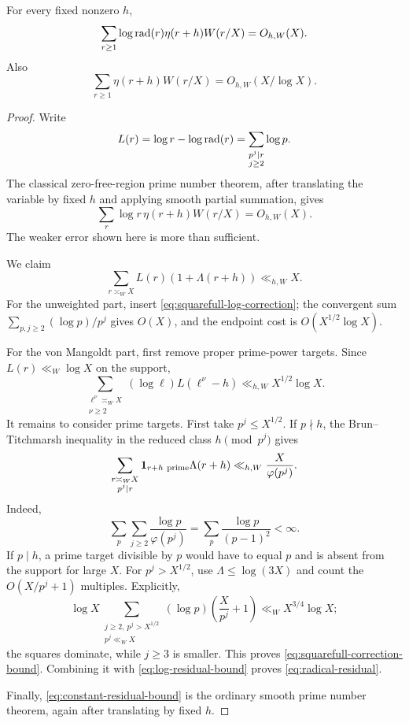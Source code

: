 \begin{lemma}
\label{lem:radical-residual}
For every fixed nonzero $h$,
\begin{equation}
 \sum_{r\geq1}\log\operatorname{rad}(r)\eta(r+h)W(r/X)
 =O_{h,W}(X).
 \label{eq:radical-residual}
\end{equation}
Also
\begin{equation}
 \sum_{r\geq1}\eta(r+h)W(r/X)=O_{h,W}(X/\log X).
 \label{eq:constant-residual-bound}
\end{equation}
\end{lemma}

\begin{proof}
Write
\begin{equation}
 L(r)=\log r-\log\operatorname{rad}(r)
 =\sum_{\substack{p^j\mid r\\j\geq2}}\log p.
 \label{eq:squarefull-log-correction}
\end{equation}
The classical zero-free-region prime number theorem, after translating the
variable by fixed $h$ and applying smooth partial summation, gives
\begin{equation}
 \sum_r\log r\,\eta(r+h)W(r/X)=O_{h,W}(X).
 \label{eq:log-residual-bound}
\end{equation}
The weaker error shown here is more than sufficient.

We claim
\begin{equation}
 \sum_{r\asymp_WX}L(r)(1+\Lambda(r+h))\ll_{h,W}X.
 \label{eq:squarefull-correction-bound}
\end{equation}
For the unweighted part, insert \eqref{eq:squarefull-log-correction}; the
convergent sum
$\sum_{p,j\geq2}(\log p)/p^j$ gives $O(X)$, and the endpoint cost is
$O(X^{1/2}\log X)$.

For the von Mangoldt part, first remove proper prime-power targets.  Since
$L(r)\ll_W\log X$ on the support,
\[
 \sum_{\substack{\ell^\nu\asymp_W X\\\nu\geq2}}
 (\log\ell)L(\ell^\nu-h)
 \ll_{h,W}X^{1/2}\log X.
\]
It remains to consider prime targets.  First take $p^j\leq X^{1/2}$.  If
$p\nmid h$, the Brun--Titchmarsh inequality in the reduced class
$h\pmod{p^j}$ gives \citep{IwaniecKowalski2004}
\[
 \sum_{\substack{r\asymp_WX\\p^j\mid r}}
 \mathbf 1_{r+h\ {\rm prime}}\Lambda(r+h)
 \ll_{h,W}\frac X{\varphi(p^j)}.
\]
Indeed,
\[
 \sum_p\sum_{j\geq2}\frac{\log p}{\varphi(p^j)}
 =\sum_p\frac{\log p}{(p-1)^2}<\infty.
\]
If $p\mid h$, a prime target divisible by $p$ would have to equal $p$ and
is absent from the support for large $X$.  For $p^j>X^{1/2}$, use
$\Lambda\leq\log(3X)$ and count the $O(X/p^j+1)$ multiples.  Explicitly,
\[
 \log X
 \sum_{\substack{j\geq2,\ p^j>X^{1/2}\\p^j\ll_W X}}
 (\log p)\left(\frac X{p^j}+1\right)
 \ll_W X^{3/4}\log X;
\]
the squares dominate, while $j\geq3$ is smaller.  This proves
\eqref{eq:squarefull-correction-bound}.  Combining it with
\eqref{eq:log-residual-bound} proves \eqref{eq:radical-residual}.

Finally, \eqref{eq:constant-residual-bound} is the ordinary smooth prime
number theorem, again after translating by fixed $h$.
\end{proof}

